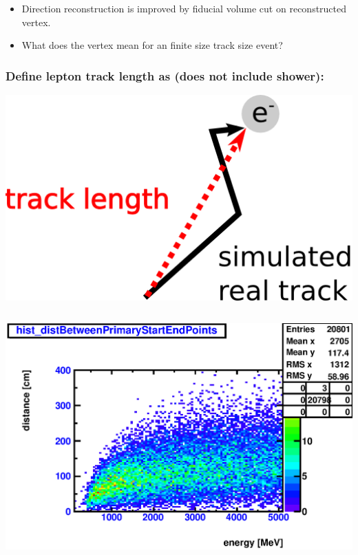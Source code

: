 \documentclass{beamer}
\begin{document}
\begin{frame}
	\begin{itemize}
		\item Direction reconstruction is improved by fiducial volume cut on
			reconstructed vertex.
		\item What does the vertex mean for an finite size track size event?
	\end{itemize}
\end{frame}

\begin{frame}
	\frametitle{Define lepton track length as (does not include shower):}
	\begin{center}
		\includegraphics[height=0.2\textheight]{track_length_definition.png}
	\end{center}
	\begin{columns}[t]
		\includegraphics[width=1.0\textwidth]{nue_H1_distBetweenPrimaryStartEndPoints_onlyCC_maxR600cm.eps}

\end{columns}
\end{frame}
\end{document}
